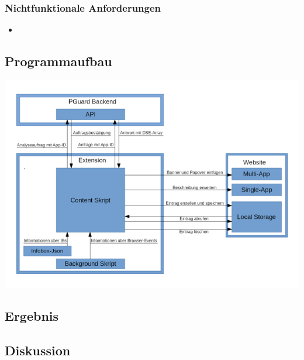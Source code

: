 \subsubsection{Nichtfunktionale Anforderungen}

\begin{itemize}
	\item 
\end{itemize}

\subsection{Programmaufbau}
\label{ss:programmaufbau}

\includegraphics{pics/Aufbau.png}

\subsection{Ergebnis}
\label{ss:ergebnisseht1}


\subsection{Diskussion}
\label{ss:diskussionht1}










